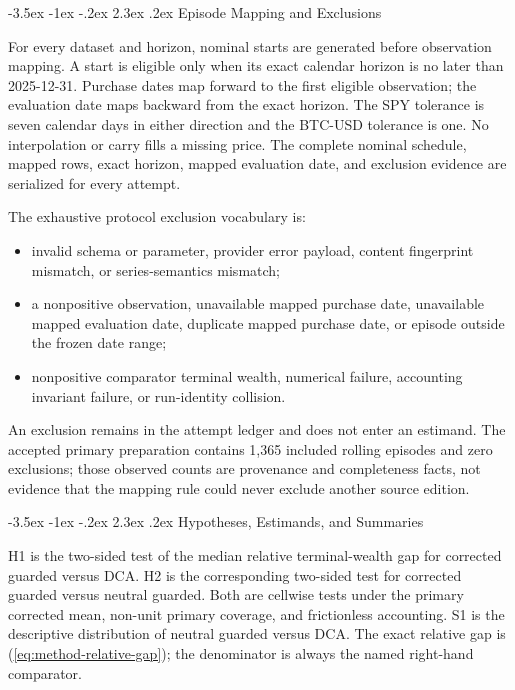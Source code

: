 \documentclass[12pt,a4paper,oneside]{report}
\makeatletter
\renewcommand\section{\@startsection{section}{1}{\z@}%
  {-3.5ex \@plus -1ex \@minus -.2ex}%
  {2.3ex \@plus .2ex}%
  {\normalfont\fontsize{14}{17}\selectfont\bfseries}}
\makeatother
\begin{document}
\section{Episode Mapping and Exclusions}
\label{sec:appendix-episode-mapping}

For every dataset and horizon, nominal starts are generated before observation
mapping. A start is eligible only when its exact calendar horizon is no later
than 2025-12-31. Purchase dates map forward to the first eligible observation;
the evaluation date maps backward from the exact horizon. The SPY tolerance is
seven calendar days in either direction and the BTC-USD tolerance is one. No
interpolation or carry fills a missing price. The complete nominal schedule,
mapped rows, exact horizon, mapped evaluation date, and exclusion evidence are
serialized for every attempt.

The exhaustive protocol exclusion vocabulary is:

\begin{itemize}
  \item invalid schema or parameter, provider error payload, content
  fingerprint mismatch, or series-semantics mismatch;
  \item a nonpositive observation, unavailable mapped purchase date,
  unavailable mapped evaluation date, duplicate mapped purchase date, or
  episode outside the frozen date range;
  \item nonpositive comparator terminal wealth, numerical failure, accounting
  invariant failure, or run-identity collision.
\end{itemize}

An exclusion remains in the attempt ledger and does not enter an estimand. The
accepted primary preparation contains 1,365 included rolling episodes and zero
exclusions; those observed counts are provenance and completeness facts, not
evidence that the mapping rule could never exclude another source edition.

\section{Hypotheses, Estimands, and Summaries}
\label{sec:appendix-hypotheses-estimands}

H1 is the two-sided test of the median relative terminal-wealth gap for
corrected guarded versus DCA. H2 is the corresponding two-sided test for
corrected guarded versus neutral guarded. Both are cellwise tests under the
primary corrected mean, non-unit primary coverage, and frictionless
accounting. S1 is the descriptive distribution of neutral guarded versus DCA.
The exact relative gap is (\ref{eq:method-relative-gap}); the denominator is
always the named right-hand comparator.
\end{document}
